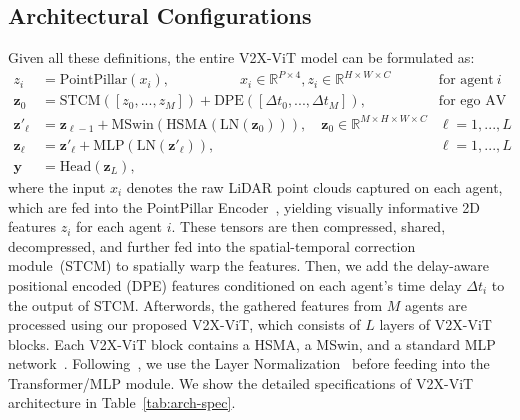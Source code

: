 \documentclass[runningheads]{llncs}
\begin{document}
\subsection{Architectural Configurations}
\label{ssec:arch-config}

Given all these definitions, the entire V2X-ViT model can be formulated as:
\begin{align}
\label{eq:tfm-block}
{z}_i & = \text{PointPillar}({x}_i),  \quad\quad\quad\quad\quad  {x}_i\in\mathbb{R}^{P\times 4},{z_i}\in\mathbb{R}^{H\times W\times C}\ & \text{for agent}\ i  \\
\mathbf{z}_0 & = \text{STCM}([z_0,...,z_M])+\text{DPE}([\Delta t_0,...,\Delta t_M]),  & \text{for ego AV}  \\
\mathbf{z}'_\ell & = \mathbf{z}_{\ell-1} + \text{MSwin}(\text{HSMA}(\text{LN}(\mathbf{z}_0))),\quad \mathbf{z}_0\in\mathbb{R}^{M\times H\times W\times C}  & \ell=1,...,L \\
\mathbf{z}_\ell & = \mathbf{z}'_\ell + \text{MLP}(\text{LN}(\mathbf{z}'_\ell)), & \ell=1,...,L \\
\mathbf{y}&=\text{Head}(\mathbf{z}_L),
\end{align}
where the input ${x}_i$ denotes the raw LiDAR point clouds captured on each agent, which are fed into the PointPillar Encoder~\cite{lang2019pointpillars}, yielding visually informative 2D features ${z}_i$ for each agent $i$. These tensors are then compressed, shared,  decompressed, and further fed into the spatial-temporal correction module~(STCM) to spatially warp the features. Then, we add the delay-aware positional encoded (DPE) features conditioned on each agent's time delay $\Delta t_i$ to the output of STCM. Afterwords, the gathered features from $M$ agents are processed using our proposed V2X-ViT, which consists of $L$ layers of V2X-ViT blocks. Each V2X-ViT block contains a HSMA, a MSwin, and a standard MLP network~\cite{dosovitskiy2020image}. Following~\cite{dosovitskiy2020image,liu2021swin}, we use the Layer Normalization~\cite{ba2016layer} before feeding into the Transformer/MLP module. We show the detailed specifications of V2X-ViT architecture in Table~\ref{tab:arch-spec}.
\end{document}
